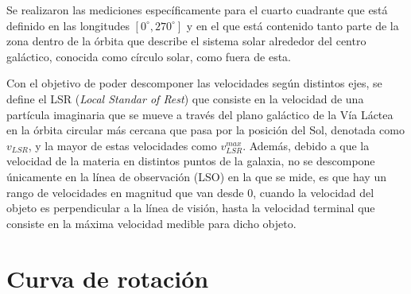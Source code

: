 \documentclass[letterpaper,oneside]{article}
\begin{document}
Se realizaron las mediciones específicamente para el cuarto cuadrante que está definido en las longitudes $[ 0^{\circ}, 270^{\circ}]$ y en el que está contenido tanto parte de la zona dentro de la órbita que describe el sistema solar alrededor del centro galáctico, conocida como círculo solar, como fuera de esta.

Con el objetivo de poder descomponer las velocidades según distintos ejes, se define el LSR (\textit{Local Standar of Rest}) que consiste en la velocidad de una partícula imaginaria que se mueve a través del plano galáctico de la Vía Láctea en la órbita circular más cercana que pasa por la posición del Sol, denotada como $v_{LSR}$, y la mayor de estas velocidades como $v_{LSR}^{max}$. Además, debido a que la velocidad de la materia en distintos puntos de la galaxia, no se descompone únicamente en la línea de observación (LSO) en la que se mide, es que hay un rango de velocidades en magnitud que van desde 0, cuando la velocidad del objeto es perpendicular a la línea de visión, hasta la velocidad terminal que consiste en la máxima velocidad medible para dicho objeto.

\section{Curva de rotación}




\end{document}
